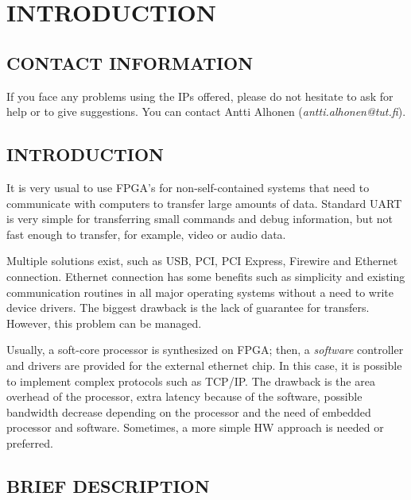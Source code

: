 \documentclass[a4paper,10pt,oneside,final]{article}
\begin{document}



\newpage
\section{INTRODUCTION}

\subsection{CONTACT INFORMATION}

If you face any problems using the IPs offered, please
do not hesitate to ask for help or to give suggestions.
You can contact Antti Alhonen (\textit{antti.alhonen@tut.fi}).

\subsection{INTRODUCTION}

It is very usual to use FPGA's for non-self-contained systems that
need to communicate with computers to transfer large amounts of data.
Standard UART is very simple for transferring small commands and
debug information, but not fast enough to transfer, for example, video
or audio data.

Multiple solutions exist, such as USB, PCI, PCI Express, Firewire and
Ethernet connection. Ethernet connection has some benefits such as
simplicity and existing communication routines in all major operating
systems without a need to write device drivers. The biggest drawback
is the lack of guarantee for transfers. However, this problem can be
managed.

Usually, a soft-core processor is synthesized on FPGA; then, a
\textit{software} controller and drivers are provided for the external
ethernet chip. In this case, it is possible to implement complex
protocols such as TCP/IP. The drawback is the area overhead of the
processor, extra latency because of the software, possible bandwidth
decrease depending on the processor and the need of embedded processor
and software. Sometimes, a more simple HW approach is needed or
preferred.

\subsection{BRIEF DESCRIPTION}
\end{document}
